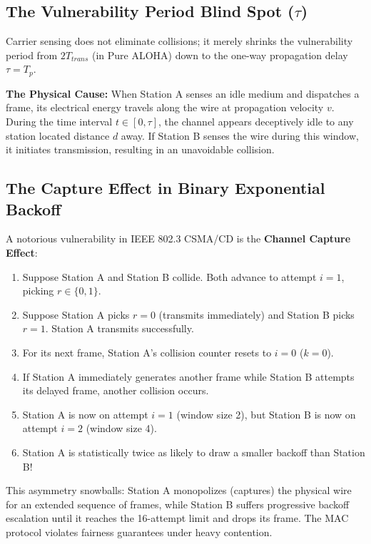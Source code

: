 \documentclass[12pt, a4paper]{article}
\begin{document}
\subsection{The Vulnerability Period Blind Spot ($\tau$)}
Carrier sensing does not eliminate collisions; it merely shrinks the vulnerability period from $2 T_{trans}$ (in Pure ALOHA) down to the one-way propagation delay $\tau = T_p$. 

\textbf{The Physical Cause:} When Station A senses an idle medium and dispatches a frame, its electrical energy travels along the wire at propagation velocity $v$. During the time interval $t \in [0, \tau]$, the channel appears deceptively idle to any station located distance $d$ away. If Station B senses the wire during this window, it initiates transmission, resulting in an unavoidable collision.

\subsection{The Capture Effect in Binary Exponential Backoff}
A notorious vulnerability in IEEE 802.3 CSMA/CD is the \textbf{Channel Capture Effect}:
\begin{enumerate}
    \item Suppose Station A and Station B collide. Both advance to attempt $i = 1$, picking $r \in \{0, 1\}$.
    \item Suppose Station A picks $r = 0$ (transmits immediately) and Station B picks $r = 1$. Station A transmits successfully.
    \item For its next frame, Station A's collision counter resets to $i = 0$ ($k = 0$).
    \item If Station A immediately generates another frame while Station B attempts its delayed frame, another collision occurs.
    \item Station A is now on attempt $i = 1$ (window size 2), but Station B is now on attempt $i = 2$ (window size 4).
    \item Station A is statistically twice as likely to draw a smaller backoff than Station B!
\end{enumerate}
This asymmetry snowballs: Station A monopolizes (captures) the physical wire for an extended sequence of frames, while Station B suffers progressive backoff escalation until it reaches the 16-attempt limit and drops its frame. The MAC protocol violates fairness guarantees under heavy contention.
\end{document}
